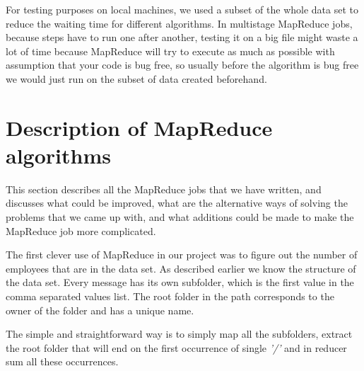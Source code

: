 \documentclass{llncs}
\begin{document}
For testing purposes on local machines, we used a subset of the whole data set to reduce the waiting time for different algorithms. In multistage MapReduce jobs, because steps have to run one after another, testing it on a big file might waste a lot of time because MapReduce will try to execute as much as possible with assumption that your code is bug free, so usually before the algorithm is bug free we would just run on the subset of data created beforehand.


\section{Description of MapReduce algorithms}
This section describes all the MapReduce jobs that we have written, and discusses what could be improved, what are the alternative ways of solving the problems that we came up with, and what additions could be made to make the MapReduce job more complicated.

The first clever use of MapReduce in our project was to figure out the number of employees that are in the data set. As described earlier we know the structure of the data set. Every message has its own subfolder, which is the first value in the comma separated values list. The root folder in the path corresponds to the owner of the folder and has a unique name.

The simple and straightforward way is to simply map all the subfolders, extract the root folder that will end on the first occurrence of single \emph{'/'} and in reducer sum all these occurrences.
\end{document}
